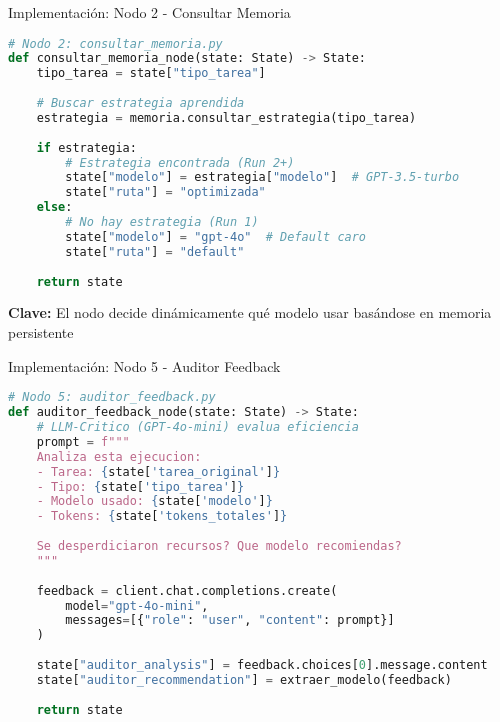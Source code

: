 \documentclass[aspectratio=169,11pt]{beamer}
\begin{document}
\begin{frame}[fragile]{Implementación: Nodo 2 - Consultar Memoria}
\begin{lstlisting}[language=Python]
# Nodo 2: consultar_memoria.py
def consultar_memoria_node(state: State) -> State:
    tipo_tarea = state["tipo_tarea"]
    
    # Buscar estrategia aprendida
    estrategia = memoria.consultar_estrategia(tipo_tarea)
    
    if estrategia:
        # Estrategia encontrada (Run 2+)
        state["modelo"] = estrategia["modelo"]  # GPT-3.5-turbo
        state["ruta"] = "optimizada"
    else:
        # No hay estrategia (Run 1)
        state["modelo"] = "gpt-4o"  # Default caro
        state["ruta"] = "default"
    
    return state
\end{lstlisting}

\vspace{0.2cm}

\textbf{Clave:} El nodo decide dinámicamente qué modelo usar basándose en memoria persistente
\end{frame}

\begin{frame}[fragile]{Implementación: Nodo 5 - Auditor Feedback}
\begin{lstlisting}[language=Python]
# Nodo 5: auditor_feedback.py
def auditor_feedback_node(state: State) -> State:
    # LLM-Critico (GPT-4o-mini) evalua eficiencia
    prompt = f"""
    Analiza esta ejecucion:
    - Tarea: {state['tarea_original']}
    - Tipo: {state['tipo_tarea']}
    - Modelo usado: {state['modelo']}
    - Tokens: {state['tokens_totales']}
    
    Se desperdiciaron recursos? Que modelo recomiendas?
    """
    
    feedback = client.chat.completions.create(
        model="gpt-4o-mini",
        messages=[{"role": "user", "content": prompt}]
    )
    
    state["auditor_analysis"] = feedback.choices[0].message.content
    state["auditor_recommendation"] = extraer_modelo(feedback)
    
    return state
\end{lstlisting}
\end{frame}
\end{document}
